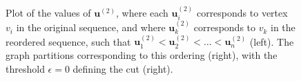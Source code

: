 \begin{figure}[h!]
\begin{subfigure}[b]{0.23\textwidth}
        \label{fig:spec_2}
    \end{subfigure}
    \caption{Plot of the values of $\mathbf{u}^{(2)}$, where each $\mathbf{u}^{(2)}_i$ corresponds to vertex
    $v_i$ in the original sequence, and where $\mathbf{u}^{(2)}_k$ corresponds to $v_k$ in the reordered sequence, such that $\mathbf{u}^{(2)}_1 < \mathbf{u}^{(2)}_2 < \dots < \mathbf{u}^{(2)}_n$ (left).
    The graph partitions corresponding to this ordering (right), with the threshold $\epsilon = 0$ defining the cut (right).
    }
    \label{fig:spec}
\end{figure}